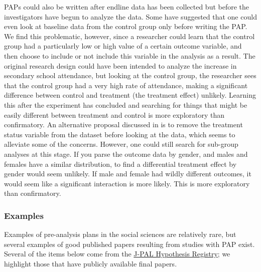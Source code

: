 \documentclass[12pt] {article}
\begin{document}
PAPs could also be written after endline data has been collected but before the investigators have begun to analyze the data. Some have suggested that one could even look at baseline data from the control group only before writing the PAP. We find this problematic, however, since a researcher could learn that the control group had a particularly low or high value of a certain outcome variable, and then choose to include or not include this variable in the analysis as a result. The original research design could have been intended to analyze the increase in secondary school attendance, but looking at the control group, the researcher sees that the control group had a very high rate of attendance, making a significant difference between control and treatment (the treatment effect) unlikely. Learning this after the experiment has concluded and searching for things that might be easily different between treatment and control is more exploratory than confirmatory. An alternative proposal discussed in \cite{OlkenPAP} is to remove the treatment status variable from the dataset before looking at the data, which seems to alleviate some of the concerns. However, one could still search for sub-group analyses at this stage. If you parse the outcome data by gender, and males and females have a similar distribution, to find a differential treatment effect by gender would seem unlikely. If male and female had wildly different outcomes, it would seem like a significant interaction is more likely. This is more exploratory than confirmatory. 


\subsubsection{Examples}\label{examples}
Examples of pre-analysis plans in the social sciences are relatively rare, but several examples of good published papers resulting from studies with PAP exist. Several of the items below come from the \href{http://www.povertyactionlab.org/Hypothesis-Registry}{J-PAL Hypothesis Registry}; we highlight those that have publicly available final papers. 
\end{document}
